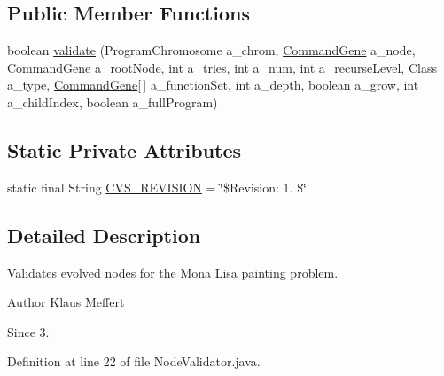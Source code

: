\subsection*{Public Member Functions}
\begin{DoxyCompactItemize}
\item 
boolean \hyperlink{classexamples_1_1gp_1_1monalisa_1_1core_1_1_node_validator_a556a20da4bc85f16470bb1b96b3d883c}{validate} (Program\-Chromosome a\-\_\-chrom, \hyperlink{classorg_1_1jgap_1_1gp_1_1_command_gene}{Command\-Gene} a\-\_\-node, \hyperlink{classorg_1_1jgap_1_1gp_1_1_command_gene}{Command\-Gene} a\-\_\-root\-Node, int a\-\_\-tries, int a\-\_\-num, int a\-\_\-recurse\-Level, Class a\-\_\-type, \hyperlink{classorg_1_1jgap_1_1gp_1_1_command_gene}{Command\-Gene}\mbox{[}$\,$\mbox{]} a\-\_\-function\-Set, int a\-\_\-depth, boolean a\-\_\-grow, int a\-\_\-child\-Index, boolean a\-\_\-full\-Program)
\end{DoxyCompactItemize}
\subsection*{Static Private Attributes}
\begin{DoxyCompactItemize}
\item 
static final String \hyperlink{classexamples_1_1gp_1_1monalisa_1_1core_1_1_node_validator_adab02c56089f3f094c8314ef5db9dd43}{C\-V\-S\-\_\-\-R\-E\-V\-I\-S\-I\-O\-N} = \char`\"{}\$Revision\-: 1. \$\char`\"{}
\end{DoxyCompactItemize}


\subsection{Detailed Description}
Validates evolved nodes for the Mona Lisa painting problem.

\begin{DoxyAuthor}{Author}
Klaus Meffert 
\end{DoxyAuthor}
\begin{DoxySince}{Since}
3. 
\end{DoxySince}


Definition at line 22 of file Node\-Validator.\-java.



